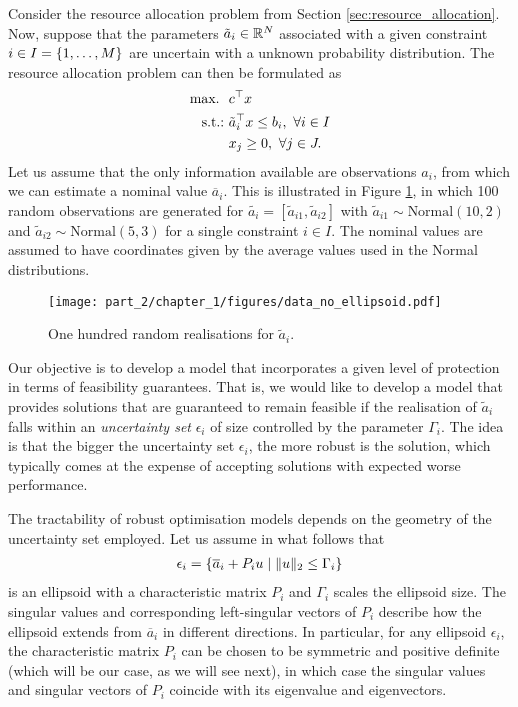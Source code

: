 Consider the resource allocation problem from Section \ref{sec:resource_allocation}. Now, suppose that the parameters $\tilde{a}_i \in \mathbb{R}^N $ associated with a given constraint $i \in I = \left\{ 1,\dots,M \right \}$ are uncertain with a unknown probability distribution. The resource allocation problem can then be formulated as
%
\begin{align*}
	\mathop{\text{max.~}} \ &  c^\top x  \\
	\mathop{\text{s.t.:~}} & \tilde{a}_{i}^\top x \leq b_i, \ \forall i \in I  \\
	& x_j \geq 0, \ \forall j \in J. 
\end{align*} 
%
Let us assume that the only information available are observations $\hat{a}_i$, from which we can estimate a nominal value $\overline{a}_i$. This is illustrated in Figure \ref{fig:random_observations}, in which 100 random observations are generated for $\tilde{a_i} = [\tilde{a}_{i1}, \tilde{a}_{i2}]$ with $\tilde{a}_{i1} \sim \text{Normal}(10,2)$ and $\tilde{a}_{i2} \sim \text{Normal}(5,3)$ for a single constraint $i \in I$. The nominal values are assumed to have coordinates given by the average values used in the Normal distributions. 
%
\begin{figure}[h]
	\texttt{[image: part\_2/chapter\_1/figures/data\_no\_ellipsoid.pdf]}
	\caption{One hundred random realisations for $\tilde{a}_i$.} \label{fig:random_observations}
\end{figure}
%
Our objective is to develop a model that incorporates a given level of protection in terms of feasibility guarantees. That is, we would like to develop a model that provides solutions that are guaranteed to remain feasible if the realisation of $\tilde{a}_i$ falls within an \emph{uncertainty set} $\epsilon_i$ of size controlled by the parameter $\Gamma_i$. The idea is that the bigger the uncertainty set $\epsilon_i$, the more robust is the solution, which typically comes at the expense of accepting solutions with expected worse performance.

The tractability of robust optimisation models depends on the geometry of the uncertainty set employed. Let us assume in what follows that 
%
\begin{align}
	\epsilon_i = \left\{ \overline{a}_i + P_iu \mid \|u\|_2 \leq \Gamma_i \right \} \label{eq:ellipsoid}
\end{align}
%
is an ellipsoid with a characteristic matrix $P_i$ and $\Gamma_i$ scales the ellipsoid size. The singular values and corresponding left-singular vectors of $P_i$ describe how the ellipsoid extends from $\overline{a}_i$ in different directions. In particular, for any ellipsoid $\epsilon_i$, the characteristic matrix $P_i$ can be chosen to be symmetric and positive definite (which will be our case, as we will see next), in which case the singular values and singular vectors of $P_i$ coincide with its eigenvalue and eigenvectors.

